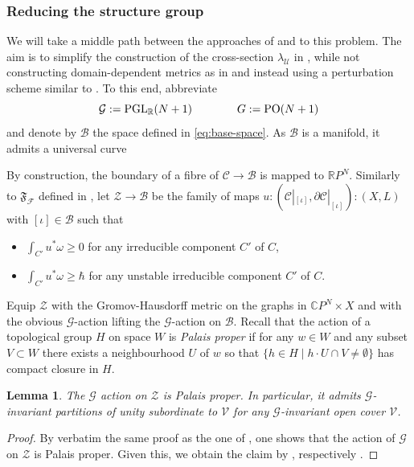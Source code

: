 \documentclass[11pt,psamsfonts, oneside, reqno]{amsart}
\newcommand{\sub}{\subset}%
\newcommand{\cl}{\colon}
\newcommand{\emst}{\emptyset}
\newcommand{\scF}{\mathscr{F}}
\newcommand{\eva}{ev}
\newcommand{\PGL}{\normalfont\text{PGL}}
\newcommand{\del}{\partial}
\newcommand{\bC}{\mathbb{C}}
\newcommand{\bR}{\mathbb{R}}
\newcommand{\cB}{\mathcal{B}}
\newcommand{\cC}{\mathcal{C}}
\newcommand{\cG}{\mathcal{G}}
\newcommand{\cU}{\mathcal{U}}
\newcommand{\cV}{\mathcal{V}}
\newcommand{\cZ}{\mathcal{Z}}
\newcommand{\fF}{\mathfrak{F}}
\newtheorem{lemma}[theorem]{Lemma}
\theoremstyle{definition}
\theoremstyle{remark}
\numberwithin{equation}{section}
\begin{document}
\subsubsection{Reducing the structure group}\label{subsec:reducing-group}
We will take a middle path between the approaches of \cite{AMS23} and \cite{HS22} to this problem. The aim is to simplify the construction of the cross-section $\lambda_\cU$ in \cite{HS22}, while not constructing domain-dependent metrics as in \cite{AMS23} and instead using a perturbation scheme similar to \cite{HS22}. To this end, abbreviate
$$\cG := \PGL_\bR(N+1)\qquad \qquad G := \text{PO}(N+1)$$\noindent
and denote by $\cB$ the space defined in \eqref{eq:base-space}. As $\cB$ is a manifold, it admits a universal curve
\begin{center} \end{center}
By construction, the boundary of a fibre of $\cC\to \cB$ is mapped to $\bR P^N$. Similarly to $\fF_{\scF}$ defined in \cite[]{AMS23}, let $\cZ\to \cB$ be the family of maps $u\cl (\cC|_{[\iota]},\del\cC|_{[\iota]})\cl (X,L)$ with $[\iota]\in \cB$ 
such that
\begin{itemize}
	\item $\int_{C'} u^*\omega\geq 0$ for any irreducible component $C'$ of $C$,
	\item $\int_{C'} u^*\omega\geq\hbar$ for any unstable irreducible component $C'$ of $C$.
\end{itemize}

Equip $\cZ$ with the Gromov-Hausdorff metric on the graphs in $\bC P^N\times X$ and with the obvious $\cG$-action lifting the $\cG$-action on $\cB$.
Recall that the action of a topological group $H$ on space $W$ is \emph{Palais proper} if for any $w\in W$ and any subset $V\sub W$ there exists a neighbourhood $U$ of $w$ so that $\{h \in H\mid h\cdot U \cap V\neq\emst\}$ has compact closure in $H$. 


\begin{lemma}\label{lem:palais-proper} The $\cG$ action on $\cZ$ is Palais proper. In particular, it admits $\cG$-invariant partitions of unity subordinate to $\cV$ for any $\cG$-invariant open cover $\cV$. 
\end{lemma}

\begin{proof} By verbatim the same proof as the one of \cite[Lemma 4.13]{AMS23}, one shows that the action of $\cG$ on $\cZ$ is Palais proper. Given this, we obtain the claim by \cite[Corollary 3.12]{AMS23}, respectively \cite[Theorem 4.3.4]{Pal61}.\end{proof}
\end{document}
